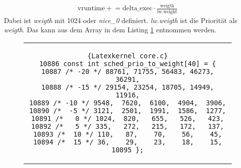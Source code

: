 \begin{align}
    \text{vruntime} \mathrel{+}= \text{delta\_exec} \cdot \frac{\text{weigth}}{\text{lw.weight}}
    \label{calc_vruntime}
\end{align}
Dabei ist \textit{weigth} mit 1024 oder \textit{nice\_0} definiert. \textit{lw.weigth} ist die Priorität als \textit{weigth}. Das kann aus dem Array in dem Listing \ref{core.c}\cite{LinuxKernel:Torvalds} entnommen werden.
\begin{figure}[h]
    \centering      
    \begin{tabular}{c}
        \begin{lstlisting}{Latexkernel core.c}
10886 const int sched_prio_to_weight[40] = {
10887 /* -20 */ 88761, 71755, 56483, 46273, 36291,
10888 /* -15 */ 29154, 23254, 18705, 14949, 11916,
10889 /* -10 */ 9548,  7620,  6100,  4904,  3906,
10890 /*  -5 */ 3121,  2501,  1991,  1586,  1277,
10891 /*   0 */ 1024,  820,   655,   526,   423,
10892 /*   5 */ 335,   272,   215,   172,   137,
10893 /*  10 */ 110,   87,    70,    56,    45,
10894 /*  15 */ 36,    29,    23,    18,    15,
10895 };
        \end{lstlisting}
    \end{tabular}
    \label{core.c}
\end{figure}
\newpage

